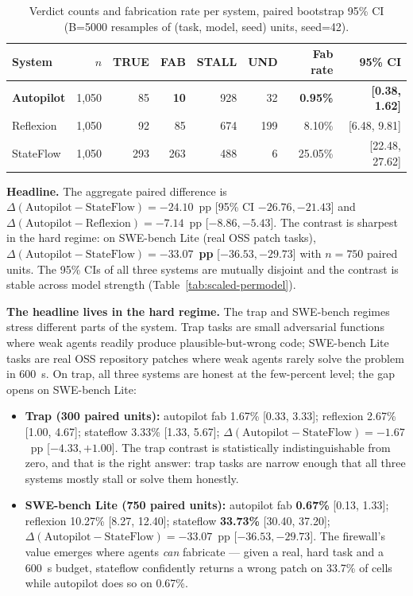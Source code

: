 {\scriptsize\begin{longtable}[]{@{}lrrrrrrr@{}}
\caption{Verdict counts and fabrication rate per system, paired bootstrap 95\% CI
(B=5000 resamples of (task, model, seed) units, seed=42).}\label{tab:scaled-headline}\\
\toprule\noalign{}
System & $n$ & TRUE & FAB & STALL & UND & Fab rate & 95\% CI \\
\midrule\noalign{}
\endhead
\bottomrule\noalign{}
\endlastfoot
\textbf{Autopilot} & 1{,}050 &  85 & \textbf{10}  & 928 &  32 & \textbf{0.95\%} & \textbf{[0.38, 1.62]} \\
Reflexion          & 1{,}050 &  92 &          85  & 674 & 199 &          8.10\% & [6.48, 9.81]          \\
StateFlow          & 1{,}050 & 293 &         263  & 488 &   6 &         25.05\% & [22.48, 27.62]        \\
\end{longtable}}

\textbf{Headline.} The aggregate paired difference is
$\Delta(\text{Autopilot} - \text{StateFlow}) = -24.10$~pp [95\% CI $-26.76, -21.43$]
and $\Delta(\text{Autopilot} - \text{Reflexion}) = -7.14$~pp [$-8.86, -5.43$]. The contrast
is sharpest in the hard regime: on SWE-bench Lite (real OSS patch tasks),
$\Delta(\text{Autopilot} - \text{StateFlow}) = \mathbf{-33.07}$~\textbf{pp} [$-36.53, -29.73$]
with $n=750$ paired units. The 95\% CIs of all three systems are mutually disjoint and the
contrast is stable across model strength (Table~\ref{tab:scaled-permodel}).

\textbf{The headline lives in the hard regime.} The trap and SWE-bench regimes stress
different parts of the system. Trap tasks are small adversarial functions where weak
agents readily produce plausible-but-wrong code; SWE-bench Lite tasks are real OSS
repository patches where weak agents rarely solve the problem in 600~s. On trap, all
three systems are honest at the few-percent level; the gap opens on SWE-bench Lite:

\begin{itemize}\tightlist
\item \textbf{Trap (300 paired units):} autopilot fab 1.67\% [0.33, 3.33];
reflexion 2.67\% [1.00, 4.67]; stateflow 3.33\% [1.33, 5.67];
$\Delta(\text{Autopilot} - \text{StateFlow}) = -1.67$~pp [$-4.33, +1.00$].
The trap contrast is statistically indistinguishable from zero, and that is the
right answer: trap tasks are narrow enough that all three systems mostly stall
or solve them honestly.
\item \textbf{SWE-bench Lite (750 paired units):} autopilot fab \textbf{0.67\%}
[0.13, 1.33]; reflexion 10.27\% [8.27, 12.40]; stateflow \textbf{33.73\%}
[30.40, 37.20]; $\Delta(\text{Autopilot} - \text{StateFlow}) = -33.07$~pp
[$-36.53, -29.73$]. The firewall's value emerges where agents \emph{can}
fabricate --- given a real, hard task and a 600~s budget, stateflow confidently
returns a wrong patch on 33.7\% of cells while autopilot does so on 0.67\%.
\end{itemize}


